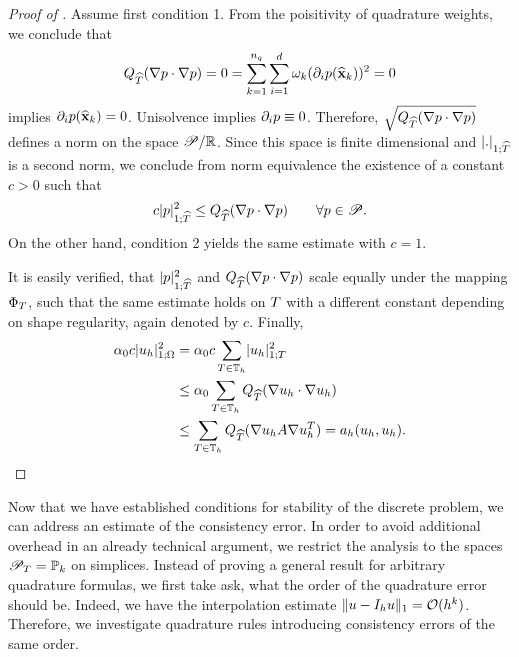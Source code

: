 \begin{proof}[Proof of ]
  Assume first condition 1. From the poisitivity of quadrature
  weights, we conclude that
  \begin{gather}
    Q_{\widehat{T}}(\nabla p\cdot\nabla p) = 0
    = \sum_{k=1}^{n_q} \sum_{i=1}^d \omega_k (\partial_ip(\widehat{\mathbf x}_k))^2 = 0
  \end{gather}
  implies $\partial_ip(\widehat{\mathbf x}_k) = 0$. Unisolvence implies
  $\partial_i p \equiv 0$. Therefore,
  $\sqrt{Q_{\widehat{T}}(\nabla p\cdot\nabla p)}$ defines a norm on the
  space $\mathscr P/\mathbb R$. Since this space is finite dimensional and
  $\lvert.\rvert_{1;\widehat{T}}$ is a second norm, we conclude from norm
  equivalence the existence of a constant $c>0$ such that
  \begin{gather}
    c \lvert p\rvert_{1;\widehat{T}}^2 \le Q_{\widehat{T}}(\nabla p\cdot\nabla p)
    \qquad\forall p\in \mathscr P.
  \end{gather}
  On the other hand, condition 2 yields the same estimate with $c=1$.

  It is easily verified, that $\lvert p\rvert_{1;\widehat{T}}^2$ and
  $Q_{\widehat{T}}(\nabla p\cdot\nabla p)$ scale equally under the
  mapping $\Phi_T$, such that the same estimate holds on $T$
  with a different constant depending on shape regularity, again
  denoted by $c$. Finally,
  \begin{align*}
    \alpha_0 c \lvert u_h\rvert_{1;\Omega}^2
    &= \alpha_0 c \sum_{T\in\mathbb T_h} \lvert u_h\rvert_{1;T}^2 \\
    &\le \alpha_0 \sum_{T\in\mathbb T_h}Q_{\widehat{T}}(\nabla u_h\cdot\nabla u_h)\\
    & \le \sum_{T\in\mathbb T_h} Q_{\widehat{T}}(\nabla u_hA\nabla u_h^T)
      = a_h(u_h,u_h).
  \end{align*}
\end{proof}

\begin{intro}
  Now that we have established conditions for stability of the
  discrete problem, we can address an estimate of the consistency
  error. In order to avoid additional overhead in an already technical
  argument, we restrict the analysis to the spaces
  $\mathscr P_T = \mathbb P_k$ on simplices. Instead of proving a
  general result for arbitrary quadrature formulas, we first take ask,
  what the order of the quadrature error should be. Indeed, we have
  the interpolation estimate $\lVert u-I_h u\rVert_{1} = \mathcal
  O(h^k)$.
  Therefore, we investigate quadrature rules introducing consistency
  errors of the same order.
\end{intro}

